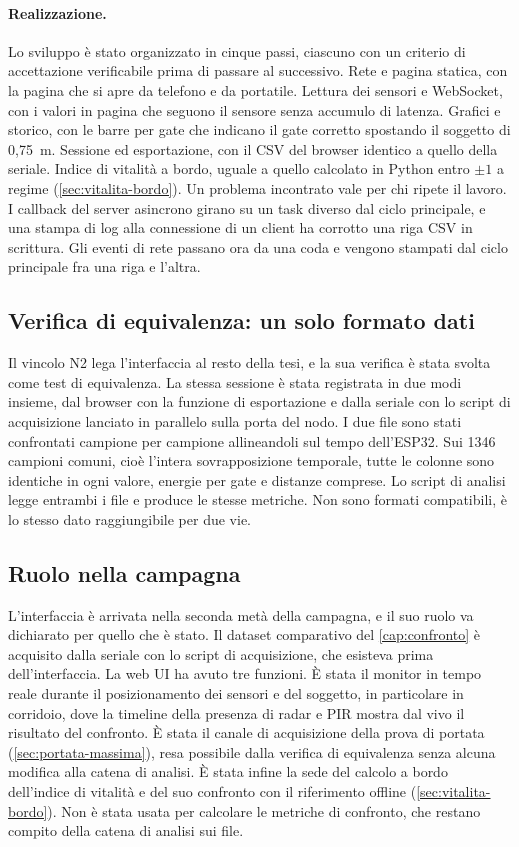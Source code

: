 \paragraph{Realizzazione.} Lo sviluppo è stato organizzato in cinque passi, ciascuno
con un criterio di accettazione verificabile prima di passare al successivo. Rete e
pagina statica, con la pagina che si apre da telefono e da portatile. Lettura dei
sensori e WebSocket, con i valori in pagina che seguono il sensore senza accumulo di
latenza. Grafici e storico, con le barre per gate che indicano il gate corretto
spostando il soggetto di 0,75~m. Sessione ed esportazione, con il CSV del browser
identico a quello della seriale. Indice di vitalità a bordo, uguale a quello
calcolato in Python entro $\pm 1$ a regime (\cref{sec:vitalita-bordo}). Un problema
incontrato vale per chi ripete il lavoro. I callback del server asincrono girano su
un task diverso dal ciclo principale, e una stampa di log alla connessione di un
client ha corrotto una riga CSV in scrittura. Gli eventi di rete passano ora da una
coda e vengono stampati dal ciclo principale fra una riga e l'altra.

\subsection{Verifica di equivalenza: un solo formato dati}
\label{sec:webui-verifica}

Il vincolo N2 lega l'interfaccia al resto della tesi, e la sua verifica è stata
svolta come test di equivalenza. La stessa sessione è stata registrata in due modi
insieme, dal browser con la funzione di esportazione e dalla seriale con lo script di
acquisizione lanciato in parallelo sulla porta del nodo. I due file sono stati
confrontati campione per campione allineandoli sul tempo dell'ESP32. Sui 1346
campioni comuni, cioè l'intera sovrapposizione temporale, tutte le colonne sono
identiche in ogni valore, energie per gate e distanze comprese. Lo script di analisi
legge entrambi i file e produce le stesse metriche. Non sono formati compatibili, è
lo stesso dato raggiungibile per due vie.

\subsection{Ruolo nella campagna}
\label{sec:webui-ruolo}

L'interfaccia è arrivata nella seconda metà della campagna, e il suo ruolo va
dichiarato per quello che è stato. Il dataset comparativo del \cref{cap:confronto} è
acquisito dalla seriale con lo script di acquisizione, che esisteva prima
dell'interfaccia. La web UI ha avuto tre funzioni. È stata il monitor in tempo reale
durante il posizionamento dei sensori e del soggetto, in particolare in corridoio,
dove la timeline della presenza di radar e PIR mostra dal vivo il risultato del
confronto. È stata il canale di acquisizione della prova di portata
(\cref{sec:portata-massima}), resa possibile dalla verifica di equivalenza senza
alcuna modifica alla catena di analisi. È stata infine la sede del calcolo a bordo
dell'indice di vitalità e del suo confronto con il riferimento offline
(\cref{sec:vitalita-bordo}). Non è stata usata per calcolare le metriche di
confronto, che restano compito della catena di analisi sui file.
